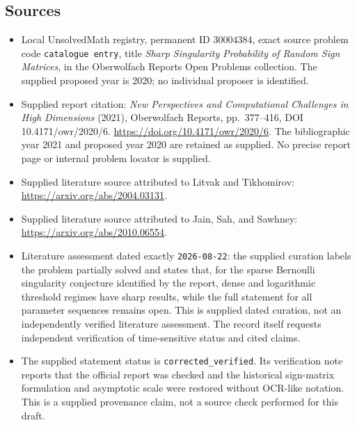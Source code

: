 \documentclass[11pt]{article}
\begin{document}
\subsection{Sources}
\begin{itemize}
\item Local UnsolvedMath registry, permanent ID \(30004384\), exact source problem code \texttt{catalogue entry}, title \emph{Sharp Singularity Probability of Random Sign Matrices}, in the Oberwolfach Reports Open Problems collection. The supplied proposed year is 2020; no individual proposer is identified.
\item Supplied report citation: \emph{New Perspectives and Computational Challenges in High Dimensions} (2021), Oberwolfach Reports, pp.\ 377--416, DOI 10.4171/owr/2020/6. \url{https://doi.org/10.4171/owr/2020/6}. The bibliographic year 2021 and proposed year 2020 are retained as supplied. No precise report page or internal problem locator is supplied.
\item Supplied literature source attributed to Litvak and Tikhomirov: \url{https://arxiv.org/abs/2004.03131}.
\item Supplied literature source attributed to Jain, Sah, and Sawhney: \url{https://arxiv.org/abs/2010.06554}.
\item Literature assessment dated exactly \texttt{2026-08-22}: the supplied curation labels the problem partially solved and states that, for the sparse Bernoulli singularity conjecture identified by the report, dense and logarithmic threshold regimes have sharp results, while the full statement for all parameter sequences remains open. This is supplied dated curation, not an independently verified literature assessment. The record itself requests independent verification of time-sensitive status and cited claims.
\item The supplied statement status is \texttt{corrected\_verified}. Its verification note reports that the official report was checked and the historical sign-matrix formulation and asymptotic scale were restored without OCR-like notation. This is a supplied provenance claim, not a source check performed for this draft.
\end{itemize}
\end{document}
